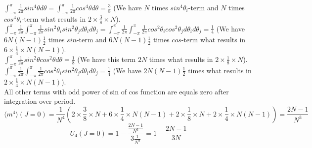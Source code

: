 $ \int_{-\pi}^{\pi}  \frac{1}{2 \pi} sin^4 \theta d \theta =\int_{-\pi}^{\pi}  \frac{1}{2 \pi} cos^4 \theta d \theta = \frac{3}{8}$ (We  have $N$ times $sin^4\theta_i$-term and $N$ times $cos^4\theta_i$-term  what results in $2\times \frac{3}{8} \times N$). \\

$ \int_{-\pi}^{\pi}  \frac{1}{2 \pi}\int_{-\pi}^{\pi} \frac{1}{2 \pi} sin^2 \theta_i sin^2 \theta_j d\theta_i  d\theta_j = \int_{-\pi}^{\pi}  \frac{1}{2 \pi}\int_{-\pi}^{\pi} \frac{1}{2 \pi} cos^2 \theta_i cos^2 \theta_j d\theta_i  d\theta_j = \frac{1}{4}$ (We  have $6N(N-1)\frac{1}{2}$ times $sin$-term and $6N(N-1)\frac{1}{2}$ times $cos$-term  what results in $6\times \frac{1}{4} \times N(N-1)$). \\

$ \int_{-\pi}^{\pi}  \frac{1}{2 \pi} sin^2 \theta cos^2 \theta d \theta  = \frac{1}{8}$ (We  have this term $2N$ times  what results in $2\times \frac{1}{8} \times N$). \\

$ \int_{-\pi}^{\pi}  \frac{1}{2 \pi}\int_{-\pi}^{\pi} \frac{1}{2 \pi} cos^2 \theta_i sin^2 \theta_j d\theta_i  d\theta_j = \frac{1}{4}$ (We  have $2N(N-1)\frac{1}{2}$ times  what results in $2\times \frac{1}{4} \times N(N-1)$). \\

All other terms with odd power of sin of cos function are equals zero after integration over period. 
\begin{equation*}
\langle m^4 \rangle (J=0) = \frac{1}{N^4} \left( 2\times \frac{3}{8} \times N + 6\times \frac{1}{4} \times N(N-1) + 2\times \frac{1}{8} \times N + 2\times \frac{1}{4} \times N(N-1)
\right) = \frac{2N-1}{N^3}
\end{equation*}
\begin{equation}
\label{binderqum_0}
U_4 (J=0) = 1 - \frac{  \frac{2N-1}{N^3} }{3  \frac{1}{N^2} } = 1 - 
\frac{2N-1}{3N}
\end{equation}
 
